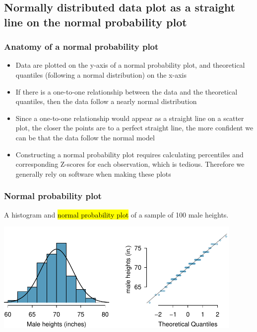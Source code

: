 \documentclass[11pt,containsverbatim,handout,xcolor=xelatex,dvipsnames,table]{beamer}
\begin{document}

\subsection{Normally distributed data plot as a straight line on the normal probability plot}
\label{mi5}


\begin{frame}
\frametitle{Anatomy of a normal probability plot}

\begin{itemize}

\item Data are plotted on the y-axis of a normal probability plot, and theoretical quantiles (following a normal distribution) on the x-axis

\pause

\item If there is a one-to-one relationship between the data and the theoretical quantiles, then the data follow a nearly normal distribution

\pause

\item Since a one-to-one relationship would appear as a straight line on a scatter plot, the closer the points are to a perfect straight line, the more confident we can be that the data follow the normal model

\pause

\item Constructing a normal probability plot requires calculating percentiles and corresponding Z-scores for each observation, which is tedious. Therefore we generally rely on software when making these plots

\end{itemize}

\end{frame}



\begin{frame}
\frametitle{Normal probability plot}

A histogram and \hl{normal probability plot} of a sample of 100 male heights.

\begin{center}
\includegraphics[width=0.9\textwidth]{figures/fcidMHeights/fcidMHeights}
\end{center}


\end{frame}
\end{document}
